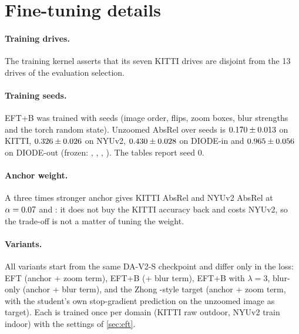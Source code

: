 \documentclass[10pt,twocolumn,letterpaper]{article}
\begin{document}


\section{Fine-tuning details}

\paragraph{Training drives.} The training kernel asserts that its seven KITTI drives are disjoint from the 13 drives
of the evaluation selection.

\paragraph{Training seeds.} EFT+B was trained with \eftbSeeds{} seeds (image order, flips, zoom boxes, blur strengths and the torch random
state). Unzoomed AbsRel over seeds is $0.170\pm0.013$ on
KITTI, $0.326\pm0.026$ on NYUv2,
$0.430\pm0.028$ on DIODE-in and
$0.965\pm0.056$ on DIODE-out (frozen: \DavTwoSFixedKittiAbsrelOne,
\DavTwoSFixedNyuAbsrelOne, \DavTwoSFixedDiodeInAbsrelOne, \DavTwoSFixedDiodeOutAbsrelOne). The tables report seed 0.

\paragraph{Anchor weight.} A three times stronger anchor gives KITTI AbsRel \DavTwoSEftbThreeKittiAbsrelOne{} and NYUv2
AbsRel \DavTwoSEftbThreeNyuAbsrelOne{} at $\alpha=0.07$ and \DavTwoSEftbThreeNyuAlpha: it does not
buy the KITTI accuracy back and costs NYUv2, so the trade-off is not a matter of tuning the weight.

\paragraph{Variants.} All variants start from the same DA-V2-S checkpoint and differ only in the loss:
EFT (anchor + zoom term), EFT+B (+ blur term), EFT+B with $\lambda=3$, blur-only (anchor + blur term),
and the Zhong \etal-style target (anchor + zoom term, with the student's own stop-gradient prediction on
the unzoomed image as target). Each is trained once per domain (KITTI raw outdoor, NYUv2 train indoor)
with the settings of \cref{sec:eft}.
\end{document}
